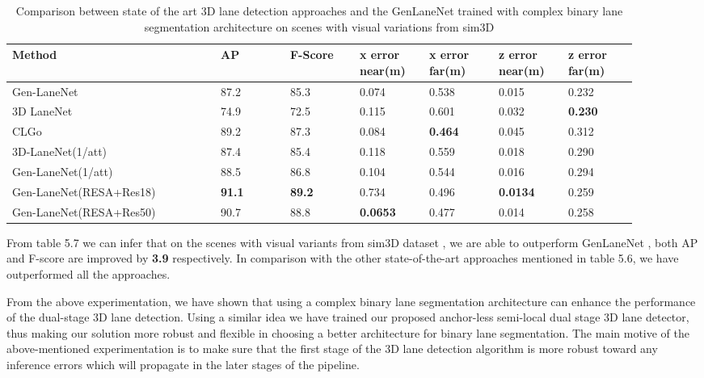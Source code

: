         \begin{table}[h]
    \centering
    \caption{Comparison between state of the art 3D lane detection approaches and the GenLaneNet \cite{guo2020gen} trained with complex binary lane segmentation architecture on scenes with visual variations from sim3D \cite{guo2020gen}}
    \begin{tabular}{|p{0.3\linewidth}|p{0.1\linewidth}|p{0.1\linewidth}|p{0.1\linewidth}|p{0.1\linewidth}|p{0.1\linewidth}|p{0.1\linewidth}|}
    \hline
        \textbf{Method} & \textbf{AP} & \textbf{F-Score} & \textbf{x error near(m)} & \textbf{x error far(m)} & \textbf{z error near(m)} & \textbf{z error far(m)} \\ \hline
        Gen-LaneNet\cite{guo2020gen} & 87.2 & 85.3 & 0.074 & 0.538 & 0.015 & 0.232 \\ \hline
        3D LaneNet\cite{DBLP:journals/corr/abs-1811-10203} & 74.9 & 72.5 & 0.115 & 0.601 & 0.032 & \textbf{0.230} \\ \hline
        CLGo \cite{DBLP:journals/corr/abs-2112-15351}& 89.2 & 87.3 & 0.084 & \textbf{0.464} & 0.045 & 0.312 \\ \hline
        3D-LaneNet(1/att) \cite{9506296} & 87.4 & 85.4 & 0.118 & 0.559 & 0.018 & 0.290 \\ \hline
        Gen-LaneNet(1/att) \cite{9506296}& 88.5 & 86.8 & 0.104 & 0.544 & 0.016 & 0.294 \\ \hline
        Gen-LaneNet(RESA+Res18) & \textbf{ 91.1} &\textbf{ 89.2} & 0.734 & 0.496 & \textbf{0.0134} & 0.259 \\ \hline
        Gen-LaneNet(RESA+Res50) & 90.7 & 88.8 & \textbf{0.0653} & 0.477 & 0.014 & 0.258 \\ \hline
    \end{tabular}
\end{table}

 From table 5.7 we can infer that on the scenes with visual variants from sim3D dataset \cite{guo2020gen}, we are able to outperform GenLaneNet \cite{guo2020gen}, both AP and F-score are improved by \textbf{3.9} respectively. In comparison with the other state-of-the-art approaches mentioned in table 5.6, we have outperformed all the approaches.
 
 From the above experimentation, we have shown that using a complex binary lane segmentation architecture can enhance the performance of the dual-stage 3D lane detection. Using a similar idea we have trained our proposed anchor-less semi-local dual stage 3D lane detector, thus making our solution more robust and flexible in choosing a better architecture for binary lane segmentation. The main motive of the above-mentioned experimentation is to make sure that the first stage of the 3D lane detection algorithm is more robust toward any inference errors which will propagate in the later stages of the pipeline. 

